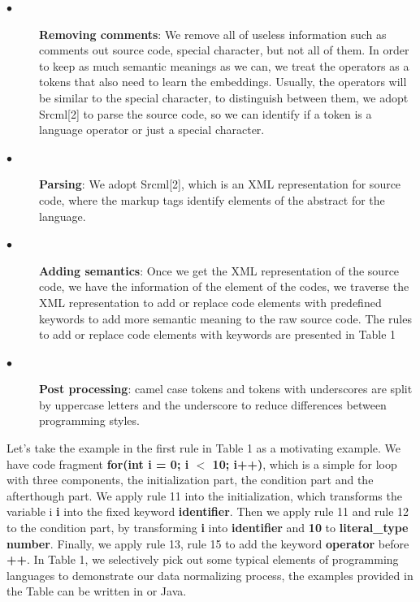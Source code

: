 \begin{description}
	\item [$\bullet$] \textbf{Removing comments}: We remove all of useless information such as comments out source code, special character, but not all of them. In order to keep as much semantic meanings as we can, we treat the operators as a tokens that also need to learn the embeddings. Usually, the operators will be similar to the special character, to distinguish between them, we adopt Srcml[2] to parse the source code, so we can identify if a token is a language operator or just a special character.
	\item [$\bullet$] \textbf{Parsing}: We adopt Srcml[2], which is an XML representation for source code, where the markup tags identify elements of the abstract for the language.
	\item [$\bullet$] \textbf{Adding semantics}: Once we get the XML representation of the source code, we have the information of the element of the codes, we traverse the XML representation to add or replace code elements with predefined keywords to add more semantic meaning to the raw source code. The rules to add or replace code elements with keywords are presented in Table 1
	\item [$\bullet$] \textbf{Post processing}: camel case tokens and tokens with underscores are split by uppercase letters and the underscore to reduce differences between programming styles.
\end{description}
 Let's take the example in the first rule in Table 1 as a motivating example. We have code fragment \textbf{for(int i = 0; i $<$ 10; i++)}, which is a simple for loop with three components, the initialization part, the condition part and the afterthough part. We apply rule 11 into the initialization, which transforms the variable i \textbf{i} into the fixed keyword \textbf{identifier}. Then we apply rule 11 and rule 12 to the condition part, by transforming \textbf{i} into \textbf{identifier} and \textbf{10} to \textbf{literal\_type number}. Finally, we apply rule 13, rule 15 to add the keyword \textbf{operator} before \textbf{++}. In Table 1, we selectively pick out some typical elements of programming languages to demonstrate our data normalizing process, the examples provided in the Table can be written in  or Java. 
 
